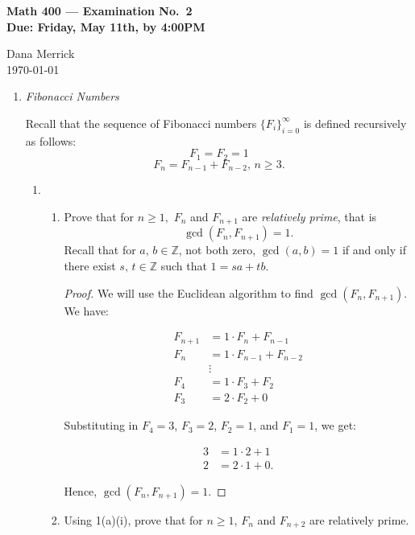 \documentclass[12pt]{amsart}
\begin{document}
\thispagestyle{empty}

\begin{center}
{\bf Math 400  --- Examination No.\ 2 \\
Due:  Friday, May 11th, by 4:00PM}
\end{center}

\bigskip

\noindent
Dana Merrick \\
\today

\bigskip

\begin{enumerate}\setlength{\itemsep}{6pt}

\item {\it Fibonacci Numbers}

Recall that the sequence of Fibonacci numbers $\{ F_i \}_{i=0}^\infty$ is defined recursively as follows:
%
\[ F_1 = F_2 = 1\]
%
\[ F_n = F_{n-1} + F_{n-2},\, n\ge 3. \]
%
\begin{enumerate}\setlength{\itemsep}{6pt}
\item
\begin{enumerate}\setlength{\itemsep}{6pt}
\item Prove that for $n\ge 1,$ $F_n$ and $F_{n+1}$ are {\it relatively prime}, that is
%
\[\gcd(F_n, F_{n+1}) = 1. \]
%
Recall that for $a,\,b \in \mathbb Z$, not both zero, $\gcd(a,b)=1$ if and only if there exist $s,\,t \in \mathbb Z$ such that $1=sa+tb$.

\begin{proof}
We will use the Euclidean algorithm to find $\gcd(F_n, F_{n+1})$. We have:

\begin{align*}
F_{n+1} &= 1 \cdot F_n + F_{n-1} \\
F_n &= 1 \cdot F_{n-1} + F_{n-2} \\
&\vdots \\
F_4 &= 1 \cdot F_3 + F_2 \\
F_3 &= 2 \cdot F_2 + 0
\end{align*}

Substituting in $F_4=3$, $F_3=2$, $F_2=1$, and $F_1=1$, we get:

\begin{align*}
3 &= 1\cdot2 + 1 \\
2 &= 2\cdot1 + 0.
\end{align*}

Hence, $\gcd(F_n, F_{n+1}) =1$.
\end{proof}

\item Using 1(a)(i), prove that for $n\ge 1$, $F_n$ and $F_{n+2}$ are relatively prime.


\end{enumerate}
\end{enumerate}
\end{enumerate}
\end{document}
